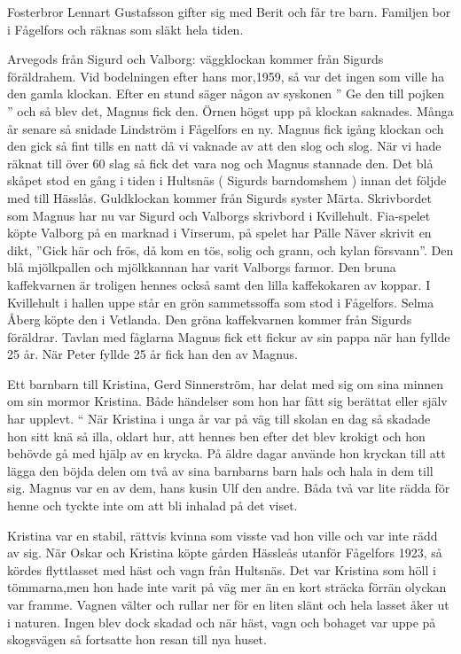 Fosterbror Lennart Gustafsson gifter sig med Berit och får tre barn. Familjen bor i Fågelfors och räknas som släkt hela tiden.


Arvegods från Sigurd och Valborg: väggklockan kommer från Sigurds föräldrahem. Vid bodelningen efter hans mor,1959, så var det ingen som ville ha den gamla klockan. Efter en stund säger någon av syskonen ” Ge den till pojken ” och så blev det, Magnus fick den. Örnen högst upp på klockan saknades. Många år senare så snidade Lindström i Fågelfors en ny. Magnus fick igång klockan och den gick så fint tills en natt då vi vaknade av att den slog och slog. När vi hade räknat till över 60 slag så fick det vara nog och Magnus stannade den. Det blå skåpet stod en gång i tiden i Hultsnäs ( Sigurds barndomshem ) innan det följde med till Hässlås.
Guldklockan kommer från Sigurds syster Märta. Skrivbordet som Magnus har nu var Sigurd och Valborgs skrivbord i Kvillehult. Fia-spelet köpte Valborg på en marknad i Virserum, på spelet har Pälle Näver skrivit en dikt, ”Gick här och frös, då kom en tös, solig och grann, och kylan försvann”.
Den blå mjölkpallen och mjölkkannan har varit Valborgs farmor. Den bruna kaffekvarnen är troligen hennes också samt den lilla kaffekokaren av koppar. I Kvillehult i hallen uppe står en grön sammetssoffa som stod i Fågelfors. Selma Åberg köpte den i Vetlanda. Den gröna kaffekvarnen kommer från Sigurds föräldrar.
Tavlan med fåglarna
Magnus fick ett fickur av sin pappa när han fyllde 25 år. När Peter fyllde 25 år fick han den av Magnus.


Ett barnbarn till Kristina, Gerd Sinnerström, har delat med sig om sina minnen om sin mormor Kristina. Både händelser som hon har fått sig berättat eller själv har upplevt.
“ När Kristina i unga år var på väg till skolan en dag så skadade hon sitt knä så illa, oklart hur,  att hennes ben efter det blev krokigt och hon behövde gå med hjälp av en krycka. På äldre dagar använde hon kryckan till att lägga den böjda delen om två av sina barnbarns barn hals och hala in dem till sig. Magnus var en av dem, hans kusin Ulf den andre. Båda två var lite rädda för henne och tyckte inte om att bli inhalad på det viset.


Kristina var en stabil, rättvis kvinna som visste vad hon ville och var inte rädd av sig. När Oskar och Kristina köpte gården Hässleås utanför Fågelfors 1923, så kördes flyttlasset med häst och vagn från Hultsnäs. Det var Kristina som höll i tömmarna,men hon hade inte varit på väg mer än en kort sträcka förrän olyckan var framme. Vagnen välter och rullar ner för en liten slänt och hela lasset åker ut i naturen. Ingen blev dock skadad och när häst, vagn och bohaget var uppe på skogsvägen så fortsatte hon resan till nya huset.


